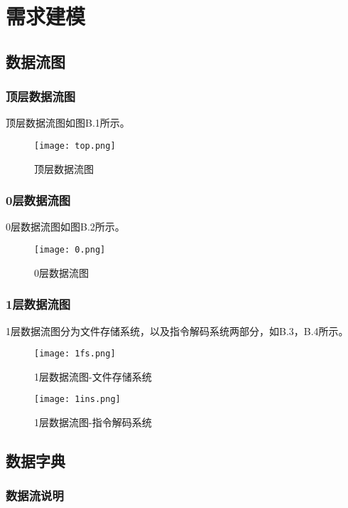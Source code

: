 \chapter{需求建模 }
\section{数据流图}
\subsection{顶层数据流图}
顶层数据流图如图B.1所示。

\begin{figure}[ht]
\centering
\texttt{[image: top.png]}
\caption{顶层数据流图}\label{fig:noted-figure}
\end{figure}

\subsection{0层数据流图}

0层数据流图如图B.2所示。

\begin{figure}
\centering
\texttt{[image: 0.png]}
\caption{0层数据流图}\label{fig:noted-figure}
\end{figure}
 
\subsection{1层数据流图}

1层数据流图分为文件存储系统，以及指令解码系统两部分，如B.3，B.4所示。

\begin{figure}
\centering
\texttt{[image: 1fs.png]}
\caption{1层数据流图-文件存储系统}\label{fig:noted-figure}
\end{figure}
 
\begin{figure}
\centering
\texttt{[image: 1ins.png]}
\caption{1层数据流图-指令解码系统}\label{fig:noted-figure}
\end{figure}


\section{数据字典}
\subsection{数据流说明}
